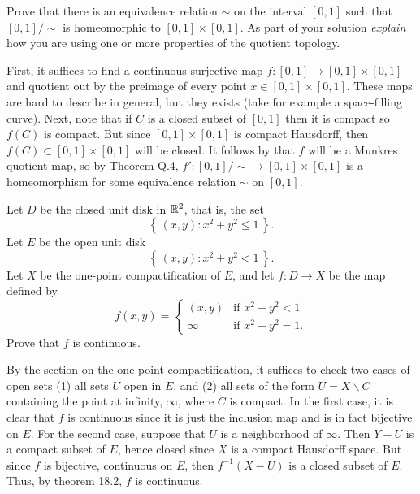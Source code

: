 \begin{problem}
Prove that there is an equivalence relation $\sim$ on the interval $[0,1]$
such that $[0,1]/{\sim}$ is homeomorphic to $[0,1]\times[0,1]$. As part of
your solution \emph{explain} how you are using one or more properties of the
quotient topology.
\end{problem}
\begin{solution}
First, it suffices to find a continuous surjective map $f\colon[0,1]\to
[0,1]\times[0,1]$ and quotient out by the preimage of every point
$x\in[0,1]\times[0,1]$. These maps are hard to describe in general, but
they exists (take for example a space-filling curve). Next, note that if
$C$ is a closed subset of $[0,1]$ then it is compact so $f(C)$ is
compact. But since $[0,1]\times[0,1]$ is compact Hausdorff, then
$f(C)\subset[0,1]\times[0,1]$ will be closed. It follows by that $f$ will
be a Munkres quotient map, so by Theorem Q.4, $f'\colon
[0,1]/{\sim}\to[0,1]\times[0,1]$ is a homeomorphism for some equivalence
relation $\sim$ on $[0,1]$.
\end{solution}

\begin{problem}
Let $D$ be the closed unit disk in $\mathbb{R}^2$, that is, the set
\[
\left\{\,(x,y):x^2+y^2\leq 1\,\right\}.
\]
Let $E$ be the open unit disk
\[
\left\{\,(x,y):x^2+y^2<1\,\right\}.
\]
Let $X$ be the one-point compactification of $E$, and let $f\colon D\to X$
be the map defined by
\[
f(x,y)=
\begin{cases}
(x,y)&\text{if $x^2+y^2<1$}\\
\infty&\text{if $x^2+y^2=1$.}
\end{cases}
\]
Prove that $f$ is continuous.
\end{problem}
\begin{solution}
By the section on the one-point-compactification, it suffices to check two
cases of open sets (1) all sets $U$ open in $E$, and (2) all sets of the
form $U=X\smallsetminus C$ containing the point at infinity, $\infty$, where $C$ is
compact. In the first case, it is clear that $f$ is continuous since it is
just the inclusion map and is in fact bijective on $E$. For the second
case, suppose that $U$ is a neighborhood of $\infty$. Then $Y-U$ is a
compact subset of $E$, hence closed since $X$ is a compact Hausdorff
space. But since $f$ is bijective, continuous on $E$, then $f^{-1}(X-U)$ is
a closed subset of $E$. Thus, by theorem 18.2, $f$ is continuous.
\end{solution}

